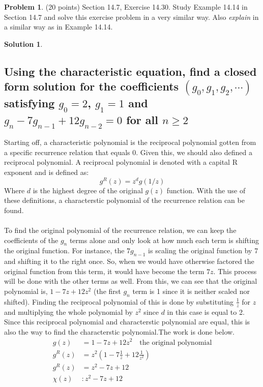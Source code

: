 \documentclass{article}
\theoremstyle{definition}
\newtheorem{problem}{Problem}
\newtheorem*{solution}{Solution}
\begin{document}
\newpage
\begin{problem} (20 points) Section 14.7, Exercise 14.30.  Study Example 14.14
in Section 14.7 and solve this exercise problem in a very similar way.  Also \textit{explain} 
in a similar way as in Example 14.14.
\end{problem}
\begin{solution}
\hspace{1cm}
\subsection*{Using the characteristic equation, find a closed form solution for the coefficients $(g_0,g_1,g_2,\cdots)$ satisfying $g_0 =2$, $g_1 = 1$ and $g_n - 7g_{n-1} + 12g_{n-2} = 0$ for all $n \geqslant 2$}
Starting off, a characteristic polynomial is the reciprocal polynomial gotten from a specific recurrence relation that equals 0. Given this, we should also defined a reciprocal polynomial. A reciprocal polynomial is denoted with a capital R exponent and is defined as:
$$ g^R(z) = z^dg(1/z) $$
Where $d$ is the highest degree of the original $g(z)$ function. With the use of these definitions, a characterstic polynomial of the recurrence relation can be found.\\\\
To find the original polynomial of the recurrence relation, we can keep the coefficients of the $g_n$ terms alone and only look at how much each term is shifting the original function. For instance, the $7g_{n-1}$ is scaling the original function by 7 and shifting it to the right once. So, when we would have otherwise factored the original function from this term, it would have become the term $7z$. This process will be done with the other terms as well. From this, we can see that the original polynomial is, $1 - 7z + 12z^2$ (the first $g_n$ term is 1 since it is neither scaled nor shifted). Finding the reciprocal polynomial of this is done by substituting $\frac{1}{z}$ for $z$ and multiplying the whole polynomial by $z^2$ since $d$ in this case is equal to 2. Since this reciprocal polynomial and characterstic polynomial are equal, this is also the way to find the characterstic polynomial.The work is done below.
\begin{align*}
g(z) &= 1 - 7z + 12z^2 \quad \mbox{the original polynomial}\\
g^{R}(z) &= z^2(1-7\frac{1}{z}+12\frac{1}{z^2})\\
g^{R}(z) &= z^2 - 7z + 12\\
\chi (z) &: z^2 - 7z + 12

\end{align*}
\end{solution}
\end{document}
